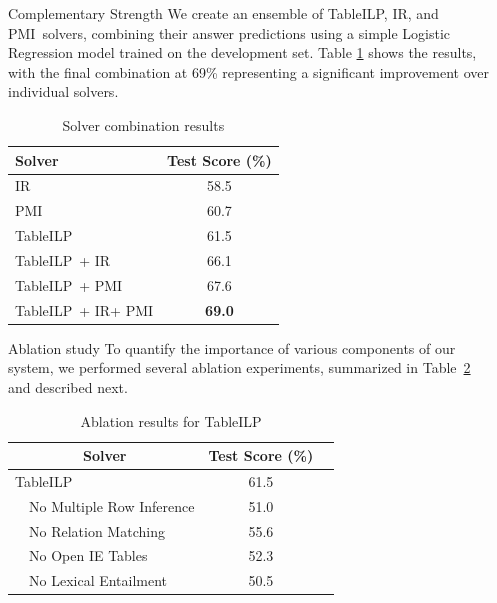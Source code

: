 \documentclass[final]{beamer}
\newlength{\sepwid}
\newlength{\onecolwid}
\newcommand{\tableilp}{TableILP}
\newcommand\lucene{IR}
\newcommand\salience{PMI}
\begin{document}
\begin{frame}[t]
\begin{columns}[t]
\begin{column}{\sepwid}\end{column} %

\begin{column}{\onecolwid} %

\begin{block}{Complementary Strength}
We create an ensemble of \tableilp, \lucene, and \salience\ solvers, combining their answer predictions using a simple Logistic Regression model trained on the development set. Table \ref{tab:combination} shows the results, with the final combination at 69\% representing a significant improvement over individual solvers.

\begin{table}[htb]
	\centering
	\small
	\setlength\tabcolsep{10pt}
	\setlength\doublerulesep{\arrayrulewidth}
	\begin{tabular}{l|c}
		Solver & Test Score (\%) \\
		\hline\hline \bigstrut[t]
		\lucene & 58.5 \\
		\salience & 60.7 \\
		\tableilp & 61.5  \\
		\tableilp\ + \lucene & 66.1 \\
		\tableilp\ + \salience & 67.6 \\
		\tableilp\ + \lucene + \salience & {\bf 69.0} \\
		\hline
	\end{tabular}
	\caption{Solver combination results}
	\label{tab:combination}
\end{table}

\begin{block}{Ablation study}
To quantify the importance of various components of our system, we performed several ablation experiments, summarized in Table~\ref{tab:ablation} and described next.

\begin{table}[htb]
	\centering
	\small
	\setlength\tabcolsep{8pt}
	\setlength\doublerulesep{\arrayrulewidth}
	\begin{tabular}{ll|cc}
		\multicolumn{2}{c|}{Solver} & Test Score (\%) \\
		\hline\hline
		\multicolumn{2}{l|}{\bigstrut[t] \tableilp} & 61.5  \\
		& No Multiple Row Inference & 51.0 \\
		& No Relation Matching & 55.6 \\
		\cline{2-3} \bigstrut[t] 
		& No Open IE Tables & 52.3  \\
		& No Lexical Entailment & 50.5  \\
		\hline 
	\end{tabular}
	\caption{Ablation results for \tableilp}
	\label{tab:ablation}
\end{table}


\end{block}
\end{block}
\end{column}
\end{columns}
\end{frame}
\end{document}
